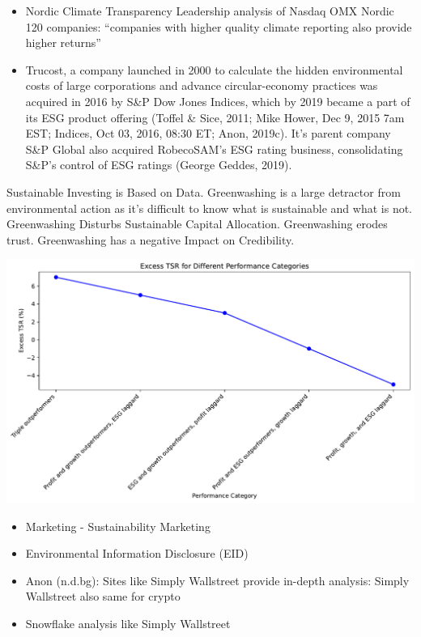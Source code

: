 \documentclass[
  letterpaper,
  DIV=11,
  numbers=noendperiod]{scrartcl}
\providecommand{\tightlist}{%
  \setlength{\itemsep}{0pt}\setlength{\parskip}{0pt}}\usepackage{longtable,booktabs,array}
\begin{document}
\begin{itemize}
\tightlist
\item
  Nordic Climate Transparency Leadership analysis of Nasdaq OMX Nordic
  120 companies: ``companies with higher quality climate reporting also
  provide higher returns''
\item
  Trucost, a company launched in 2000 to calculate the hidden
  environmental costs of large corporations and advance circular-economy
  practices was acquired in 2016 by S\&P Dow Jones Indices, which by
  2019 became a part of its ESG product offering (Toffel \& Sice, 2011;
  Mike Hower, Dec 9, 2015 7am EST; Indices, Oct 03, 2016, 08:30 ET;
  Anon, 2019c). It's parent company S\&P Global also acquired
  RobecoSAM's ESG rating business, consolidating S\&P's control of ESG
  ratings (George Geddes, 2019).
\end{itemize}

Sustainable Investing is Based on Data. Greenwashing is a large
detractor from environmental action as it's difficult to know what is
sustainable and what is not. Greenwashing Disturbs Sustainable Capital
Allocation. Greenwashing erodes trust. Greenwashing has a negative
Impact on Credibility.

\includegraphics{_thesis_files/figure-pdf/cell-54-output-1.pdf}

\begin{itemize}
\item
  Marketing - Sustainability Marketing
\item
  Environmental Information Disclosure (EID)
\item
  Anon (n.d.bg): Sites like Simply Wallstreet provide in-depth analysis:
  Simply Wallstreet also same for crypto
\item
  Snowflake analysis like Simply Wallstreet
\end{itemize}
\end{document}
